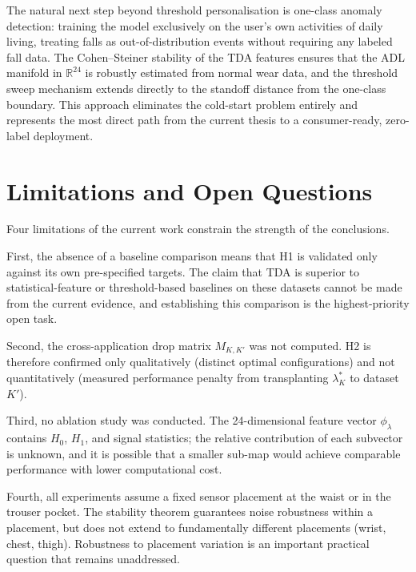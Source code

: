 \documentclass[onluarkali,ingilizce,yukseklisans,karton,LisansustuEgitim]{itutez}
\providecommand{\R}{\mathbb{R}}
\providecommand{\1}{\mathbf{1}}
\begin{document}
The natural next step beyond threshold personalisation is one-class anomaly detection:
training the model exclusively on the user's own activities of daily living,
treating falls as out-of-distribution events without requiring any labeled fall data.
The Cohen--Steiner stability of the TDA features ensures that the ADL manifold in
$\R^{24}$ is robustly estimated from normal wear data, and the threshold sweep
mechanism extends directly to the standoff distance from the one-class boundary.
This approach eliminates the cold-start problem entirely and represents the most
direct path from the current thesis to a consumer-ready, zero-label deployment.

\section{Limitations and Open Questions}
\label{subsec:conclusion-limits}

Four limitations of the current work constrain the strength of the conclusions.

First, the absence of a baseline comparison means that H1 is validated only against
its own pre-specified targets.  The claim that TDA is superior to statistical-feature
or threshold-based baselines on these datasets cannot be made from the current
evidence, and establishing this comparison is the highest-priority open task.

Second, the cross-application drop matrix $M_{K,K'}$ was not computed.  H2 is
therefore confirmed only qualitatively (distinct optimal configurations) and not
quantitatively (measured performance penalty from transplanting $\lambda^*_K$ to
dataset $K'$).

Third, no ablation study was conducted.  The 24-dimensional feature vector
$\phi_\lambda$ contains $H_0$, $H_1$, and signal statistics; the relative
contribution of each subvector is unknown, and it is possible that a smaller
sub-map would achieve comparable performance with lower computational cost.

Fourth, all experiments assume a fixed sensor placement at the waist or in the
trouser pocket.  The stability theorem guarantees noise robustness within a
placement, but does not extend to fundamentally different placements (wrist, chest,
thigh).  Robustness to placement variation is an important practical question that
remains unaddressed.

\end{document}
